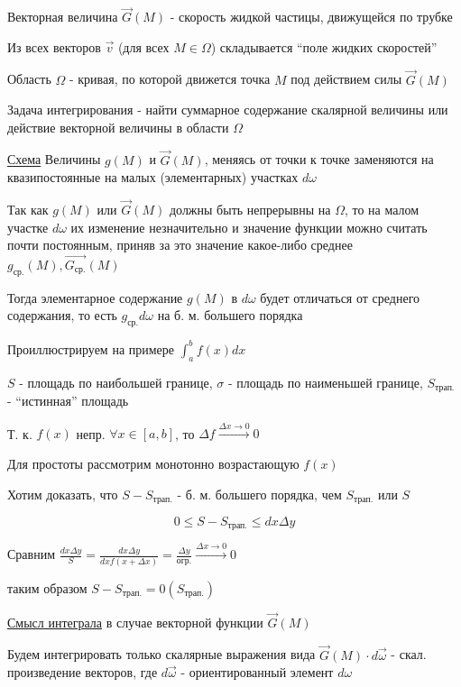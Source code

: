 \documentclass[12pt]{article}
\begin{document}
    Векторная величина $\overrightarrow{G}(M)$ - скорость жидкой частицы, движущейся по трубке

    Из всех векторов $\overrightarrow{v}$ (для всех $M \in \Omega$) складывается \enquote{поле жидких скоростей}

    \Ex Область $\Omega$ - кривая, по которой движется точка $M$ под действием силы $\overrightarrow{G}(M)$

    Задача интегрирования - найти суммарное содержание скалярной величины или действие векторной величины в области $\Omega$

    \underline{Схема} Величины $g(M)$ и $\overrightarrow{G}(M)$, меняясь от точки к точке заменяются на квазипостоянные на малых (элементарных) участках $d\omega$

    Так как $g(M)$ или $\overrightarrow{G}(M)$ должны быть непрерывны на $\Omega$, то на малом участке $d\omega$ их изменение незначительно и
    значение функции можно считать почти постоянным, приняв за это значение какое-либо среднее $g_{\text{ср.}}(M), \overrightarrow{G_{\text{ср.}}}(M)$

    Тогда элементарное содержание $g(M)$ в $d\omega$ будет отличаться от среднего содержания, то есть $g_{\text{ср.}}d\omega$ на б. м. большего порядка

    \Ex Проиллюстрируем на примере $\int_a^b f(x) dx$

    $S$ - площадь по наибольшей границе, $\sigma$ - площадь по наименьшей границе, $S_{\text{трап.}}$ - \enquote{истинная} площадь

    Т. к. $f(x)$ непр. $\forall x \in [a, b]$, то $\Delta f \stackrel{\Delta x \to 0}{\rightarrow} 0$

    Для простоты рассмотрим монотонно возрастающую $f(x)$

    Хотим доказать, что $S - S_{\text{трап.}}$ - б. м. большего порядка, чем $S_{\text{трап.}}$ или $S$

    \[0 \leq S - S_{\text{трап.}} \leq dx \Delta y\]

    Сравним $\frac{dx \Delta y}{S} = \frac{dx \Delta y}{dx f(x + \Delta x)} = \frac{\Delta y}{\text{огр.}} \stackrel{\Delta x \to 0}{\rightarrow} 0$

    таким образом $S - S_{\text{трап.}} = 0 (S_{\text{трап.}})$

    \underline{Смысл интеграла} в случае векторной функции $\overrightarrow{G}(M)$

    Будем интегрировать только скалярные выражения вида $\overrightarrow{G}(M) \cdot d\overrightarrow{\omega}$ - скал. произведение векторов,
    где $d\overrightarrow{\omega}$ - ориентированный элемент $d\omega$
\end{document}
